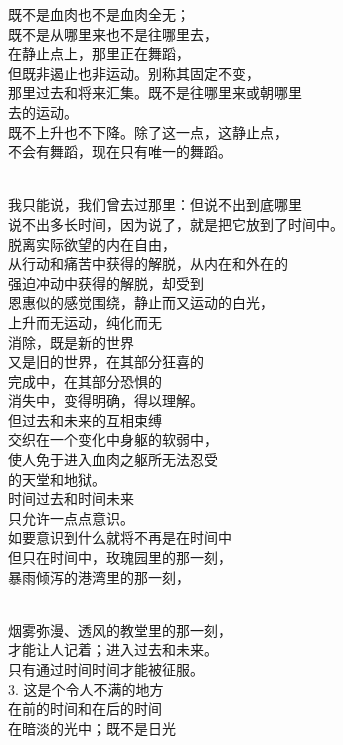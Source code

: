 \documentclass{article}
\begin{document}
既不是血肉也不是血肉全无；\\
既不是从哪里来也不是往哪里去，\\
在静止点上，那里正在舞蹈，\\
但既非遏止也非运动。别称其固定不变，\\
那里过去和将来汇集。既不是往哪里来或朝哪里\\
去的运动。\\
既不上升也不下降。除了这一点，这静止点，\\
不会有舞蹈，现在只有唯一的舞蹈。 \par \newpage  \par 
\\
我只能说，我们曾去过那里：但说不出到底哪里\\
说不出多长时间，因为说了，就是把它放到了时间中。\\
脱离实际欲望的内在自由，\\
从行动和痛苦中获得的解脱，从内在和外在的\\
强迫冲动中获得的解脱，却受到\\
恩惠似的感觉围绕，静止而又运动的白光，\\
上升而无运动，纯化而无\\
消除，既是新的世界\\
又是旧的世界，在其部分狂喜的\\
完成中，在其部分恐惧的\\
消失中，变得明确，得以理解。\\
但过去和未来的互相束缚\\
交织在一个变化中身躯的软弱中，\\
使人免于进入血肉之躯所无法忍受\\
的天堂和地狱。\\
时间过去和时间未来\\
只允许一点点意识。\\
如要意识到什么就将不再是在时间中\\
但只在时间中，玫瑰园里的那一刻，\\
暴雨倾泻的港湾里的那一刻， \par \newpage  \par 
\\
烟雾弥漫、透风的教堂里的那一刻，\\
才能让人记着；进入过去和未来。\\
只有通过时间时间才能被征服。\\
3. 这是个令人不满的地方\\
在前的时间和在后的时间\\
在暗淡的光中；既不是日光\\
\end{document}
